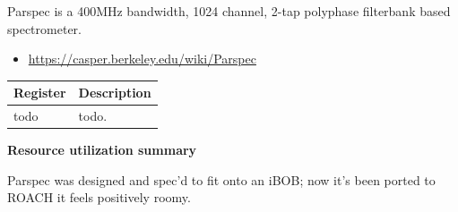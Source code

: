 \documentclass[letterpaper,10pt,english]{sphinxmanual}
\begin{document}
Parspec is a 400MHz bandwidth, 1024 channel, 2-tap polyphase filterbank based
spectrometer.
\begin{itemize}
\item {} 
\href{https://casper.berkeley.edu/wiki/Parspec}{https://casper.berkeley.edu/wiki/Parspec}

\end{itemize}

\begin{tabulary}{\linewidth}{|L|L|}
\hline
\textbf{
Register
} & \textbf{
Description
}\\\hline

todo
 & 
todo.
\\\hline
\end{tabulary}


\textbf{Resource utilization summary}

Parspec was designed and spec'd to fit onto an iBOB; now it's been ported to
ROACH it feels positively roomy.
\end{document}

